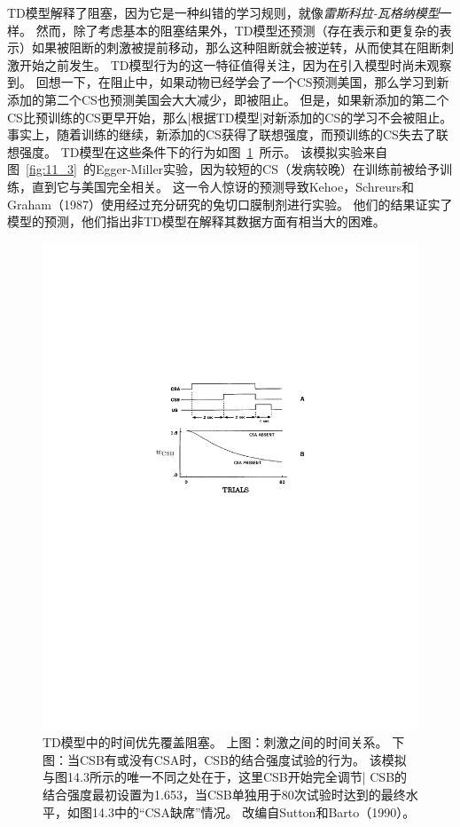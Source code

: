 {	
TD模型解释了阻塞，因为它是一种纠错的学习规则，就像\textit{雷斯科拉-瓦格纳模型}一样。
然而，除了考虑基本的阻塞结果外，TD模型还预测（存在表示和更复杂的表示）如果被阻断的刺激被提前移动，那么这种阻断就会被逆转，从而使其在阻断刺激开始之前发生。
TD模型行为的这一特征值得关注，因为在引入模型时尚未观察到。
回想一下，在阻止中，如果动物已经学会了一个CS预测美国，那么学习到新添加的第二个CS也预测美国会大大减少，即被阻止。
但是，如果新添加的第二个CS比预训练的CS更早开始，那么|根据TD模型|对新添加的CS的学习不会被阻止。
事实上，随着训练的继续，新添加的CS获得了联想强度，而预训练的CS失去了联想强度。
TD模型在这些条件下的行为如图~\ref{fig:11_4}~所示。
该模拟实验来自图~\ref{fig:11_3}~的Egger-Miller实验，因为较短的CS（发病较晚）在训练前被给予训练，直到它与美国完全相关。
这一令人惊讶的预测导致Kehoe，Schreurs和Graham（1987）使用经过充分研究的兔切口膜制剂进行实验。
他们的结果证实了模型的预测，他们指出非TD模型在解释其数据方面有相当大的困难。


\begin{figure}[!htb]
	\centering
	\includegraphics[width=0.5\linewidth]{chap11/fig_11_4}
	\caption{TD模型中的时间优先覆盖阻塞。
		上图：刺激之间的时间关系。
		下图：当CSB有或没有CSA时，CSB的结合强度试验的行为。
		该模拟与图14.3所示的唯一不同之处在于，这里CSB开始完全调节| CSB的结合强度最初设置为1.653，当CSB单独用于80次试验时达到的最终水平，如图14.3中的“CSA缺席”情况。
		改编自Sutton和Barto（1990）。 \label{fig:11_4}}
\end{figure}


}
